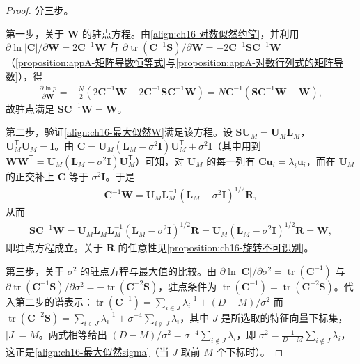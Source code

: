 \documentclass[../../main.tex]{subfiles}
\begin{document}
\begin{proof}
分三步。

第一步，关于 $\bm{W}$ 的驻点方程。由\eqref{align:ch16-对数似然约简}，并利用 $\partial\ln|\bm{C}|/\partial\bm{W}=2\bm{C}^{-1}\bm{W}$ 与 $\partial\operatorname{tr}(\bm{C}^{-1}\bm{S})/\partial\bm{W}=-2\bm{C}^{-1}\bm{S}\bm{C}^{-1}\bm{W}$（\cref{proposition:appA-矩阵导数恒等式}与\cref{proposition:appA-对数行列式的矩阵导数}），得
\begin{align*}
  \frac{\partial\ln p}{\partial\bm{W}}=-\frac{N}{2}\left(2\bm{C}^{-1}\bm{W}-2\bm{C}^{-1}\bm{S}\bm{C}^{-1}\bm{W}\right)=N\bm{C}^{-1}\left(\bm{S}\bm{C}^{-1}\bm{W}-\bm{W}\right),
\end{align*}
故驻点满足 $\bm{S}\bm{C}^{-1}\bm{W}=\bm{W}$。

第二步，验证\eqref{align:ch16-最大似然W}满足该方程。设 $\bm{S}\bm{U}_M=\bm{U}_M\bm{L}_M$，$\bm{U}_M^{\mathsf T}\bm{U}_M=\bm{I}$。由 $\bm{C}=\bm{U}_M(\bm{L}_M-\sigma^2\bm{I})\bm{U}_M^{\mathsf T}+\sigma^2\bm{I}$（其中用到 $\bm{W}\bm{W}^{\mathsf T}=\bm{U}_M(\bm{L}_M-\sigma^2\bm{I})\bm{U}_M^{\mathsf T}$）可知，对 $\bm{U}_M$ 的每一列有 $\bm{C}\bm{u}_i=\lambda_i\bm{u}_i$，而在 $\bm{U}_M$ 的正交补上 $\bm{C}$ 等于 $\sigma^2\bm{I}$。于是
\begin{align*}
  \bm{C}^{-1}\bm{W}=\bm{U}_M\bm{L}_M^{-1}\left(\bm{L}_M-\sigma^2\bm{I}\right)^{1/2}\bm{R},
\end{align*}
从而
\begin{align*}
  \bm{S}\bm{C}^{-1}\bm{W}=\bm{U}_M\bm{L}_M\bm{L}_M^{-1}\left(\bm{L}_M-\sigma^2\bm{I}\right)^{1/2}\bm{R}=\bm{U}_M\left(\bm{L}_M-\sigma^2\bm{I}\right)^{1/2}\bm{R}=\bm{W},
\end{align*}
即驻点方程成立。关于 $\bm{R}$ 的任意性见\cref{proposition:ch16-旋转不可识别}。

第三步，关于 $\sigma^2$ 的驻点方程与最大值的比较。由 $\partial\ln|\bm{C}|/\partial\sigma^2=\operatorname{tr}(\bm{C}^{-1})$ 与 $\partial\operatorname{tr}(\bm{C}^{-1}\bm{S})/\partial\sigma^2=-\operatorname{tr}(\bm{C}^{-2}\bm{S})$，驻点条件为 $\operatorname{tr}(\bm{C}^{-1})=\operatorname{tr}(\bm{C}^{-2}\bm{S})$。代入第二步的谱表示：$\operatorname{tr}(\bm{C}^{-1})=\sum_{i\in J}\lambda_i^{-1}+(D-M)/\sigma^2$ 而 $\operatorname{tr}(\bm{C}^{-2}\bm{S})=\sum_{i\in J}\lambda_i^{-1}+\sigma^{-4}\sum_{i\notin J}\lambda_i$，其中 $J$ 是所选取的特征向量下标集，$|J|=M$。两式相等给出 $(D-M)/\sigma^2=\sigma^{-4}\sum_{i\notin J}\lambda_i$，即 $\sigma^2=\frac{1}{D-M}\sum_{i\notin J}\lambda_i$，这正是\eqref{align:ch16-最大似然sigma}（当 $J$ 取前 $M$ 个下标时）。


\end{proof}
\end{document}
